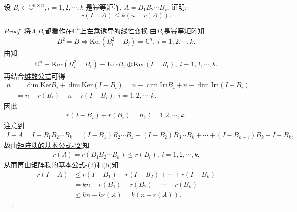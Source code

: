 \documentclass[../../main.tex]{subfiles}%
\begin{document}
\begin{example}
设 $B_i \in \mathbb{C}^{n \times n}, i = 1, 2, \cdots, k$ 是幂等矩阵, $A = B_1 B_2 \cdots B_k$, 证明:
$$
r(I - A) \leqslant k(n - r(A)).
$$
\end{example}
\begin{proof}
将$A$,$B_i$都看作在$\mathbb{C}^n$上左乘诱导的线性变换.由$B_i$是幂等矩阵知
\begin{align*}
B^2 = B \Longleftrightarrow \mathrm{Ker} (B_i^2 - B_i) = \mathbb{C}^n,\ i = 1,2,\cdots,k.
\end{align*}
由知
\begin{align*}
\mathbb{C}^n = \mathrm{Ker} (B_i^2 - B_i) = \mathrm{Ker} B_i \oplus \mathrm{Ker} (I - B_i),\ i = 1,2,\cdots,k.
\end{align*}
再结合\hyperref[theorem:线性映射的维数公式]{维数公式}可得
\begin{align*}
n &= \dim \mathrm{Ker} B_i + \dim \mathrm{Ker} (I - B_i) = n - \dim \mathrm{Im} B_i + n - \dim \mathrm{Im} (I - B_i) \\
&= n - r(B_i) + n - r(I - B_i),\ i = 1,2,\cdots,k.
\end{align*}
因此
\begin{align*}
r(I - B_i) + r(B_i) = n,\ i = 1,2,\cdots,k. 
\end{align*}
注意到
\begin{align*}
I - A = I - B_1B_2\cdots B_k = (I - B_1)B_2\cdots B_k + (I - B_2)B_3\cdots B_k + \cdots + (I - B_{k-1})B_k + I - B_k,
\end{align*}
故由\hyperref[proposition:矩阵秩的基本公式]{矩阵秩的基本公式-(2)}知
\begin{align*}
r(A) = r(B_1B_2\cdots B_k) \leqslant r(B_i),\ i = 1,2,\cdots,k.
\end{align*}
从而再由\hyperref[proposition:矩阵秩的基本公式]{矩阵秩的基本公式-(2)和(5)}知
\begin{align*}
r(I - A) &\leqslant r(I - B_1) + r(I - B_2) + \cdots + r(I - B_k) \\
&= kn - r(B_1) - r(B_2) - \cdots - r(B_k) \\
&\leqslant kn - kr(A) = k(n - r(A)).
\end{align*}
\end{proof}
\end{document}
